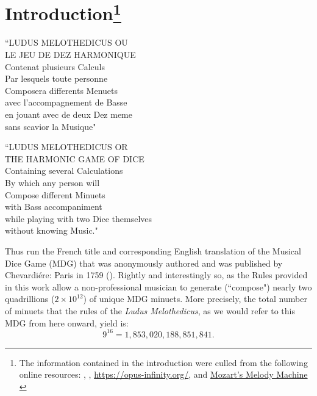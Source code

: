\documentclass[a4paper,x11names,svgnames,10pt]{article}
\begin{document}
{\section[Introduction]{Introduction\footnote{The information contained in the introduction were culled from the following online resources:
	\citet{ludus1759}, 
	\citet{wiki_mw2017},
	\url{https://opus-infinity.org/}, and 
	\href{https://www.sciencenews.org/article/mozarts-melody-machine-0}{Mozart's Melody Machine} \citep*{peterson2001}
	}
}
	\begin{center}
	\begin{minipage}{0.4\textwidth}
	\begin{flushleft}
		\begin{center}
			``\small LUDUS MELOTHEDICUS OU \\ LE JEU DE DEZ HARMONIQUE \\
			Contenat plusieurs Calculs \\
			Par lesquels toute personne \\ Composera differents Menuets \\ 
			avec l'accompagnement de Basse  \\
			en jouant avec de deux Dez meme  \\
			sans scavior la Musique"
		\end{center}
	\end{flushleft}
	\end{minipage}
	\begin{minipage}{0.4\textwidth}
	\begin{flushright}
		\begin{center}
		``\small LUDUS MELOTHEDICUS OR \\ THE HARMONIC GAME OF DICE \\
		Containing several Calculations \\ 
		By which any person will \\
		Compose different Minuets \\ 
		with Bass accompaniment \\
		while playing with two Dice themselves \\ 
		without knowing Music."
	\end{center}
	\end{flushright}
	\end{minipage}
	\end{center}

Thus run the French title and corresponding English translation of the Musical Dice Game (MDG) that was anonymously authored and was published by Chevardi\'{e}re: Paris in 1759 (\citealp{ludus1759}).  Rightly and interestingly so, as the Rules provided in this work allow a non-professional musician to generate (``compose") nearly two quadrillions ($2 \times 10^{12}$) of unique MDG minuets.  More precisely, the total number of minuets that the rules of the {\it Ludus Melothedicus}, as we would refer to this MDG from here onward, yield is: $$9^{16} = 1\!,853\!,020\!,188\!,851\!,841.$$ 

}
\end{document}
